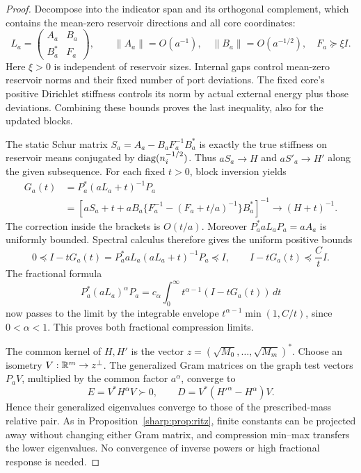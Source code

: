 \begin{proof}
Decompose into the indicator span and its orthogonal complement, which
contains the mean-zero reservoir directions and all core coordinates:
\[
 L_a=\begin{pmatrix}A_a&B_a\\B_a^*&F_a\end{pmatrix},\qquad
 \|A_a\|=O(a^{-1}),\quad\|B_a\|=O(a^{-1/2}),\quad F_a\succeq\xi I.
\]
Here $\xi>0$ is independent of reservoir sizes. Internal gaps control
mean-zero reservoir norms and their fixed number of port deviations.
The fixed core's positive Dirichlet stiffness controls its norm by
actual external energy plus those deviations. Combining these bounds
proves the last inequality, also for the updated blocks.

The static Schur matrix $S_a=A_a-B_aF_a^{-1}B_a^*$ is exactly the true
stiffness on reservoir means conjugated by $\operatorname{diag}(n_i^{-1/2})$.
Thus $aS_a\to H$ and $aS'_a\to H'$ along the given subsequence.
For each fixed $t>0$, block inversion yields
\begin{align*}
 G_a(t)&=P_a^*(aL_a+t)^{-1}P_a\\
 &=\left[aS_a+t+
   aB_a\{F_a^{-1}-(F_a+t/a)^{-1}\}B_a^*\right]^{-1}
       \longrightarrow(H+t)^{-1}.
\end{align*}
The correction inside the brackets is $O(t/a)$. Moreover
$P_a^*aL_aP_a=aA_a$ is uniformly bounded. Spectral calculus therefore
gives the uniform positive bounds
\[
 0\preceq I-tG_a(t)
   =P_a^*aL_a(aL_a+t)^{-1}P_a
   \preceq I,\qquad
 I-tG_a(t)\preceq \frac Ct I.
\]
The fractional formula
\[
 P_a^*(aL_a)^\alpha P_a
       =c_\alpha\int_0^\infty t^{\alpha-1}(I-tG_a(t))\,dt
\]
now passes to the limit by the integrable envelope
$t^{\alpha-1}\min(1,C/t)$, since $0<\alpha<1$. This proves both
fractional compression limits.

The common kernel of $H,H'$ is the vector
$z=(\sqrt{M_0},\ldots,\sqrt{M_m})^*$.
Choose an isometry $V:\mathbb R^m\to z^\perp$. The generalized Gram matrices
on the graph test vectors $P_aV$, multiplied by the common factor
$a^\alpha$, converge to
\[
 E=V^*H^\alpha V\succ0,\qquad
 D=V^*({H'}^\alpha-H^\alpha)V.
\]
Hence their generalized eigenvalues converge to those of the
prescribed-mass relative pair. As in Proposition~\ref{sharp:prop:ritz},
finite constants can be projected away without changing either Gram
matrix, and compression min--max transfers the lower eigenvalues.
No convergence of inverse powers or high fractional response is needed.
\end{proof}

